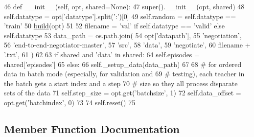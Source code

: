 \begin{DoxyCode}
46     \textcolor{keyword}{def }\_\_init\_\_(self, opt, shared=None):
47         super().\_\_init\_\_(opt, shared)
48         self.datatype = opt[\textcolor{stringliteral}{'datatype'}].split(\textcolor{stringliteral}{':'})[0]
49         self.random = self.datatype == \textcolor{stringliteral}{'train'}
50         \hyperlink{namespaceparlai_1_1mturk_1_1tasks_1_1talkthewalk_1_1download_a8c0fbb9b6dfe127cb8c1bd6e7c4e33fd}{build}(opt)
51 
52         filename = \textcolor{stringliteral}{'val'} \textcolor{keywordflow}{if} self.datatype == \textcolor{stringliteral}{'valid'} \textcolor{keywordflow}{else} self.datatype
53         data\_path = os.path.join(
54             opt[\textcolor{stringliteral}{'datapath'}],
55             \textcolor{stringliteral}{'negotiation'},
56             \textcolor{stringliteral}{'end-to-end-negotiator-master'},
57             \textcolor{stringliteral}{'src'},
58             \textcolor{stringliteral}{'data'},
59             \textcolor{stringliteral}{'negotiate'},
60             filename + \textcolor{stringliteral}{'.txt'},
61         )
62 
63         \textcolor{keywordflow}{if} shared \textcolor{keywordflow}{and} \textcolor{stringliteral}{'data'} \textcolor{keywordflow}{in} shared:
64             self.episodes = shared[\textcolor{stringliteral}{'episodes'}]
65         \textcolor{keywordflow}{else}:
66             self.\_setup\_data(data\_path)
67 
68         \textcolor{comment}{# for ordered data in batch mode (especially, for validation and}
69         \textcolor{comment}{# testing), each teacher in the batch gets a start index and a step}
70         \textcolor{comment}{# size so they all process disparate sets of the data}
71         self.step\_size = opt.get(\textcolor{stringliteral}{'batchsize'}, 1)
72         self.data\_offset = opt.get(\textcolor{stringliteral}{'batchindex'}, 0)
73 
74         self.reset()
75 
\end{DoxyCode}


\subsection{Member Function Documentation}
\mbox{\label{classparlai_1_1tasks_1_1dealnodeal_1_1agents_1_1NegotiationTeacher_a840acd160a3c71edd83a4e6d227dbd1f}} 
